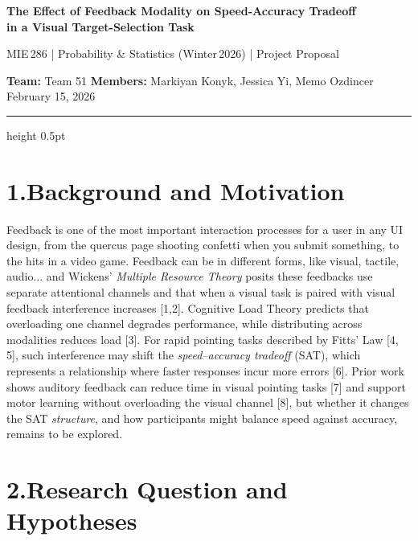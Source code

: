 \documentclass[12pt,letterpaper]{article}
\begin{document}
\begin{center}
{\large\bfseries The Effect of Feedback Modality on Speed-Accuracy Tradeoff\\[0.05em]in a Visual Target-Selection Task\par}
\vspace{0.05em}
{\small MIE\,286 | Probability \& Statistics (Winter\,2026) | Project Proposal\par}
\vspace{0.05em}
{\small\textbf{Team:} Team 51 \hspace{0.6em}\textbf{Members:} Markiyan Konyk, Jessica Yi, Memo Ozdincer \hspace{0.6em}February 15, 2026\par}
\end{center}
\vspace{-0.8em}
{\color{accent}\hrule height 0.5pt}
\vspace{0.15em}

\section*{1.\enspace Background and Motivation}
\enspace Feedback is one of the most important interaction processes for a user in any UI design, from the quercus page shooting confetti when you submit something, to the hits in a video game. Feedback can be in different forms, like visual, tactile, audio... and Wickens' \textit{Multiple Resource Theory} posits these feedbacks use separate attentional channels and that when a visual task is paired with visual feedback interference increases [1,2].  
Cognitive Load Theory predicts that overloading one channel degrades performance, while distributing across modalities reduces load [3]. For rapid pointing tasks described by Fitts' Law [4,\,5], such interference may shift the \emph{speed--accuracy tradeoff} (SAT), which represents a relationship where faster responses incur more errors [6]. Prior work shows auditory feedback can reduce time in visual pointing tasks [7] and support motor learning without overloading the visual channel [8], but whether it changes the SAT \emph{structure}, and how participants might balance speed against accuracy, remains to be explored.

\section*{2.\enspace Research Question and Hypotheses}
\end{document}
